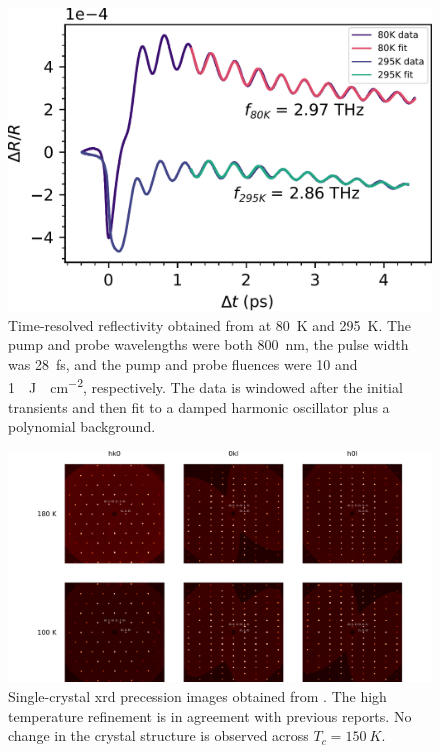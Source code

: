 \begin{figure}
\centering
\includegraphics[width=\textwidth]{./gfx/ch6/pp.pdf}
\captionsetup{singlelinecheck=off}
\caption[Pump-probe spectroscopy of \cmb]{
\label{cmb-pp}
Time-resolved reflectivity obtained from \cmb at \qty{80}{K} and \qty{295}{K}.
The pump and probe wavelengths were both \qty{800}{nm}, the pulse width was \qty{28}{fs}, and the pump and probe fluences were \num{10} and \qty{1}{\mu J \cdot cm^{-2}}, respectively.
The data is windowed after the initial transients and then fit to a damped harmonic oscillator plus a polynomial background.
}
\end{figure}

\begin{figure}
\centering
\includegraphics[width=\textwidth]{./gfx/ch6/xrd.pdf}
\captionsetup{singlelinecheck=off}
\caption[ of \cmb]{
\label{cmb-xrd}
Single-crystal \gls{xrd} precession images obtained from \cmb.
The high temperature refinement is in agreement with previous reports\citep{gibson_magnetic_2015}.
No change in the crystal structure is observed across $T_c=\qty{150}{K}$.
}
\end{figure}

